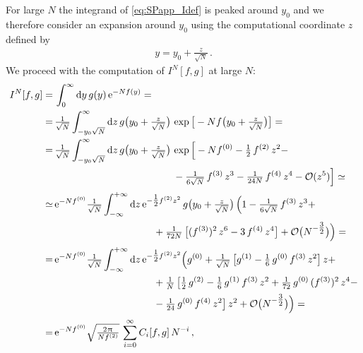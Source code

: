 For large $N$ the integrand of \cref{eq:SPapp_Idef} is peaked around $y_0$ and we therefore consider an expansion around $y_0$ using the computational coordinate $z$ defined by
	\begin{align}
		y = y_0 + \tfrac{z}{\sqrt{N}} \, .
	\end{align}
We proceed with the computation of $I^N [ f, g ]$ at large $N$:
\begin{subequations}\label{eq:SPapp}
\begin{align}	
	I^N [ f, g ] =\,& \int_{0}^{\infty} \dif y \, g ( y ) \, \eu^{- N f ( y )} =	 
	\\
	= \, & \tfrac{1}{\sqrt{N}} \int_{- y_0 \sqrt{N}}^{\infty} \dif z \, g \big( y_0 + \tfrac{z}{\sqrt{N}} \big) \, \exp \big[ - N f \big( y_0 +\tfrac{z}{\sqrt{N}} \big) \big] =		\label{eq:SPapp_Ishift}
	\\
	= \, & \tfrac{1}{\sqrt{N}} \int_{- y_0 \sqrt{N}}^{\infty} \dif z \, g \big( y_0 + \tfrac{z}{\sqrt{N}} \big) \, \exp \Big[ - N f^{(0)} - \tfrac{1}{2} \, f^{(2)} \, z^2 -\notag\\[.1em]
	&\qquad\qquad\qquad\qquad\qquad\qquad- \tfrac{1}{6 \sqrt{N}} \, f^{(3)} \, z^3 - \tfrac{1}{24 N} \, f^{(4)} \, z^4 - \order ( z^5 ) \Big] \simeq	 
	\\[.2em]
	\simeq \, & \eu^{- N f^{(0)}} \tfrac{1}{\sqrt{N}} \int_{-\infty}^{+\infty} \dif z \, \eu^{- \tfrac{1}{2} f^{(2)} z^2} \, g \big( y_0 + \tfrac{z}{\sqrt{N}} \big) \, \Big( 1 - \tfrac{1}{6 \sqrt{N}} \, f^{(3)} \, z^3 +\notag\\[.1em]
	&\qquad\qquad\qquad\qquad\qquad+\tfrac{1}{72 N} \, \big[ ( f^{(3)} )^2 \, z^6 - 3 \, f^{(4)} \, z^4 \big] + \order \big( N^{-\tfrac{3}{2}} \big) \Big) =	 
	\\[.2em]
	= \, & \eu^{- N f^{(0)}} \tfrac{1}{\sqrt{N}}\int_{-\infty}^{+\infty} \dif z \, \eu^{-\tfrac{1}{2} f^{(2)} z^2} \Big( g^{(0)} + \tfrac{1}{\sqrt{N}} \, \big[ g^{(1)} - \tfrac{1}{6} \, g^{(0)} \, f^{(3)} \, z^2 \big] \, z +		\notag\\
	& \qquad\qquad\qquad\qquad\qquad + \tfrac{1}{N} \, \big[ \tfrac{1}{2} \, g^{(2)} - \tfrac{1}{6} \, g^{(1)} \, f^{(3)} \, z^2 + \tfrac{1}{72} \, g^{(0)} \, ( f^{(3)} )^2 \, z^4 - \notag\\[.1em]
	& \qquad\qquad\qquad\qquad\qquad -\tfrac{1}{24} \, g^{(0)} \, f^{(4)} \, z^2 \big] \, z^2 + \order \big( N^{-\tfrac{3}{2}} \big) \Big) =	\label{eq:SPapp_int}	
	\\[.2em]
	= \, & \eu^{- N f^{(0)}} \sqrt{\tfrac{2 \piu}{N f^{(2)}}} \, \sum_{i = 0}^{\infty} C_i [ f, g ] \, N^{-i} \, ,	 \label{eq:SPapp_Isp}
\end{align}
\end{subequations}
